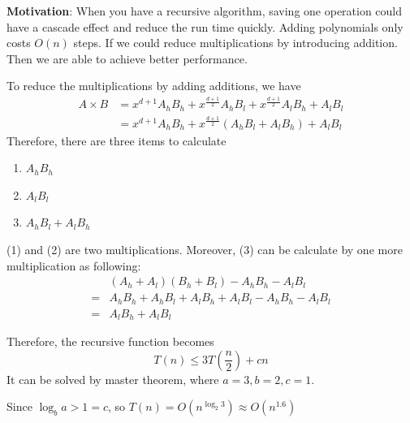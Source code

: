 \textbf{Motivation}: When you have a recursive algorithm, saving  one operation 
could have a cascade effect and reduce the run time quickly. Adding polynomials 
only costs $O(n)$ steps. If we could reduce multiplications by introducing 
addition. Then we are able to achieve better performance. 

To reduce the multiplications by adding additions, we have
\begin{align*}
 A \times B &= x^{d+1}A_h B_h + x^{\frac{d+1}{2}}A_h B_l + x^{\frac{d+1}{2}}A_l 
B_h + A_lB_l\\
            &= x^{d+1}A_h B_h + x^{\frac{d+1}{2}}(A_h B_l + A_l B_h) + A_l 
B_l
\end{align*}
Therefore, there are three items to calculate
\begin{enumerate}[(1)]
 \item $A_h B_h$
 \item $A_l B_l$
 \item $A_h B_l + A_l B_h$
\end{enumerate}
(1) and (2) are two multiplications. Moreover, (3) can be calculate by one more 
multiplication as following:
\begin{align*}
 &  (A_h + A_l) (B_h + B_l) - A_h B_h - A_l B_l\\
 =& A_hB_h + A_hB_l + A_lB_h + A_lB_l - A_h B_h - A_l B_l\\
 =& A_lB_h + A_lB_l
\end{align*}

Therefore, the recursive function becomes
\[T(n) \le 3T(\frac{n}{2}) + cn\]
It can be solved by master theorem, where $a = 3, b = 2, c = 1$.

Since $\log_ba > 1 = c$, so $T(n) = O(n^{\log_2 3}) \approx O(n^{1.6})$